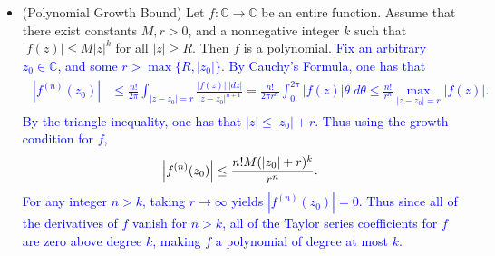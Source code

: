 \documentclass{article}
\newcommand{\expl}[1]{\textcolor{blue}{#1}}
\begin{document}
\begin{itemize}
		\item (Polynomial Growth Bound) Let $f: \mathbb{C} \to \mathbb{C}$ be an entire function. Assume that there exist constants $M, r > 0$, and a nonnegative integer $k$ such that $|f(z)| \leq M|z|^{k}$ for all $|z| \geq R$. Then $f$ is a polynomial. \newline 
		\expl{
			Fix an arbitrary $z_{0} \in \mathbb{C}$, and some $r > \max\{R, |z_{0}|\}$. By Cauchy's Formula, one has that 
			\begin{align*}
				\begin{split}
					|f^{(n)}(z_{0})| &\leq \frac{n!}{2\pi}\int_{|z - z_{0}| = r}\frac{|f(z)|\;|dz|}{|z - z_{0}|^{n + 1}} = \frac{n!}{2\pi r^{n}}\int_{0}^{2\pi}|f(z)|\theta\;d\theta \leq \frac{n!}{r^{n}}\max_{|z - z_{0}| = r}|f(z)|. 
				\end{split}
			\end{align*}
		By the triangle inequality, one has that $|z| \leq |z_{0}| + r$. Thus using the growth condition for $f$, 
		\begin{equation*}
			\left| f^{(n)}(z_0) \right| \leq \frac{n! M (\left| z_{0} \right| + r)^k}{r^n}. 
		\end{equation*}
		For any integer $n > k$, taking $r \to \infty$ yields $|f^{(n)}(z_{0})| = 0$. Thus since all of the derivatives of $f$ vanish for $n > k$, all of the Taylor series coefficients for $f$ are zero above degree $k$, making $f$ a polynomial of degree at most $k$. 
		}
	\end{itemize}
\end{document}
